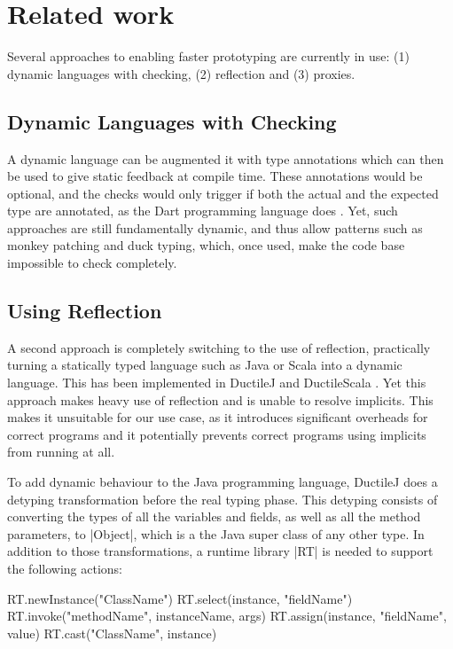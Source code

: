 \section{Related work}

Several approaches to enabling faster prototyping are currently in use: (1) dynamic languages with checking, (2) reflection and (3) proxies.

\subsection{Dynamic Languages with Checking}

A dynamic language can be augmented it with type annotations which can then be used to give static feedback at compile time. These annotations would be optional, and the checks would only trigger if both the actual and the expected type are annotated, as the Dart programming language does \cite{dart}. Yet, such approaches are still fundamentally dynamic, and thus allow patterns such as monkey patching and duck typing, which, once used, make the code base impossible to check completely.

\subsection{Using Reflection}

A second approach is completely switching to the use of reflection, practically turning a statically typed language such as Java or Scala into a dynamic language. This has been implemented in DuctileJ and DuctileScala \cite{ductilej,ductilescala}. Yet this approach makes heavy use of reflection and is unable to resolve implicits. This makes it unsuitable for our use case, as it introduces significant overheads for correct programs and it potentially prevents correct programs using implicits from running at all.

To add dynamic behaviour to the Java programming language, DuctileJ \cite{ductilej} does a detyping transformation before the real typing phase. This detyping consists of converting the types of all the variables and fields, as well as all the method parameters, to |Object|, which is a the Java super class of any other type. In addition to those transformations, a runtime library |RT| is needed to support the following actions:

\begin{lstlisting-nobreak}
RT.newInstance("ClassName")
RT.select(instance, "fieldName")
RT.invoke("methodName", instanceName, args)
RT.assign(instance, "fieldName", value)
RT.cast("ClassName", instance)
\end{lstlisting-nobreak}


